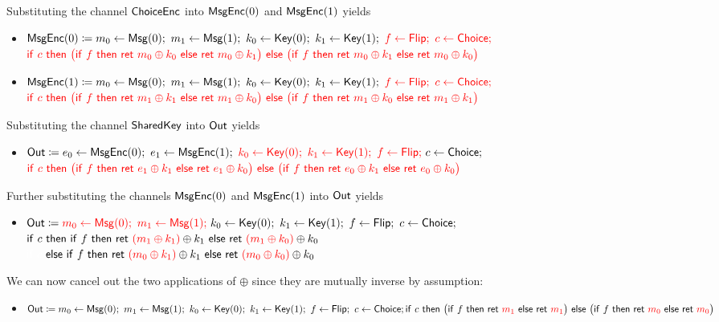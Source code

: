 \noindent Substituting the channel $\mathsf{ChoiceEnc}$ into $\mathsf{MsgEnc}(0)$ and $\mathsf{MsgEnc}(1)$ yields
\begin{itemize}
\item $\mathsf{MsgEnc}(0) \coloneqq m_0 \leftarrow \mathsf{Msg}(0); \ m_1 \leftarrow \mathsf{Msg}(1); \ k_0 \leftarrow \mathsf{Key}(0); \ k_1 \leftarrow \mathsf{Key}(1); \ {\color{red} f \leftarrow \mathsf{Flip}; \ c \leftarrow \mathsf{Choice};}$ \\ ${\color{red} \mathsf{if} \ c \ \mathsf{then} \ \big(\mathsf{if} \ f \ \mathsf{then} \ \mathsf{ret} \ m_0 \oplus k_0 \ \mathsf{else} \ \mathsf{ret} \ m_0 \oplus k_1\big) \ \mathsf{else} \ \big(\mathsf{if} \ f \ \mathsf{then} \ \mathsf{ret} \ m_0 \oplus k_1 \ \mathsf{else} \ \mathsf{ret} \ m_0 \oplus k_0\big)}$
\item $\mathsf{MsgEnc}(1) \coloneqq m_0 \leftarrow \mathsf{Msg}(0); \ m_1 \leftarrow \mathsf{Msg}(1); \ k_0 \leftarrow \mathsf{Key}(0); \ k_1 \leftarrow \mathsf{Key}(1); \ {\color{red} f \leftarrow \mathsf{Flip}; \ c \leftarrow \mathsf{Choice};}$ \\ ${\color{red} \mathsf{if} \ c \ \mathsf{then} \ \big(\mathsf{if} \ f \ \mathsf{then} \ \mathsf{ret} \ m_1 \oplus k_1 \ \mathsf{else} \ \mathsf{ret} \ m_1 \oplus k_0\big) \ \mathsf{else} \ \big(\mathsf{if} \ f \ \mathsf{then} \ \mathsf{ret} \ m_1 \oplus k_0 \ \mathsf{else} \ \mathsf{ret} \ m_1 \oplus k_1\big)}$
\end{itemize}
Substituting the channel $\mathsf{SharedKey}$ into $\mathsf{Out}$ yields
\begin{itemize}
\item $\mathsf{Out} \coloneqq e_0 \leftarrow \mathsf{MsgEnc}(0); \ e_1 \leftarrow \mathsf{MsgEnc}(1); \ {\color{red} k_0 \leftarrow \mathsf{Key}(0); \ k_1 \leftarrow \mathsf{Key}(1); \ f \leftarrow \mathsf{Flip};} \ c \leftarrow \mathsf{Choice}; $ \\ ${\color{red} \mathsf{if} \ c \ \mathsf{then} \ \big(\mathsf{if} \ f \ \mathsf{then} \ \mathsf{ret} \ e_1 \oplus k_1 \ \mathsf{else} \ \mathsf{ret} \ e_1 \oplus k_0\big) \ \mathsf{else} \ \big(\mathsf{if} \ f \ \mathsf{then} \ \mathsf{ret} \ e_0 \oplus k_1 \ \mathsf{else} \ \mathsf{ret} \ e_0 \oplus k_0\big)}$
\end{itemize}
Further substituting the channels $\mathsf{MsgEnc}(0)$ and $\mathsf{MsgEnc}(1)$ into $\mathsf{Out}$ yields
\begin{itemize}
\item $\mathsf{Out} \coloneqq {\color{red} m_0 \leftarrow \mathsf{Msg}(0); \ m_1 \leftarrow \mathsf{Msg}(1);} \ k_0 \leftarrow \mathsf{Key}(0); \ k_1 \leftarrow \mathsf{Key}(1); \ f \leftarrow \mathsf{Flip}; \ c \leftarrow \mathsf{Choice};$ \\ $\mathsf{if} \ c \ \mathsf{then} \ \ifte{f}{\ret{{\color{red} (m_1 \oplus k_1)} \oplus k_1}}{\ret{{\color{red} (m_1 \oplus k_0)} \oplus k_0}}$ \\ ${\color{white} \mathsf{if} \ c \ } \mathsf{else} \ \ifte{f}{\ret{{\color{red} (m_0 \oplus k_1)} \oplus k_1}}{\ret{{\color{red} (m_0 \oplus k_0)} \oplus k_0}}$
\end{itemize}
We can now cancel out the two applications of $\oplus$ since they are mutually inverse by assumption:
\begin{itemize}
\item $\mathsf{Out} \coloneqq m_0 \leftarrow \mathsf{Msg}(0); \ m_1 \leftarrow \mathsf{Msg}(1); \ k_0 \leftarrow \mathsf{Key}(0); \ k_1 \leftarrow \mathsf{Key}(1); \ f \leftarrow \mathsf{Flip}; \ c \leftarrow \mathsf{Choice}; \\ \mathsf{if} \ c \ \mathsf{then} \ \big(\mathsf{if} \ f \ \mathsf{then} \ \mathsf{ret} \ {\color{red} m_1} \ \mathsf{else} \ \mathsf{ret} \ {\color{red} m_1}\big) \ \mathsf{else} \ \big(\mathsf{if} \ f \ \mathsf{then} \ \mathsf{ret} \ {\color{red} m_0} \ \mathsf{else} \ \mathsf{ret} \ {\color{red} m_0}\big)$
\end{itemize}
